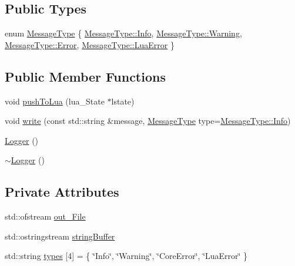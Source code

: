 \subsection*{Public Types}
\begin{DoxyCompactItemize}
\item 
enum \hyperlink{classZeta_1_1Logger_a8d3c7c723be28f87ac974c2dd07a1659}{Message\+Type} \{ \hyperlink{classZeta_1_1Logger_a8d3c7c723be28f87ac974c2dd07a1659a4059b0251f66a18cb56f544728796875}{Message\+Type\+::\+Info}, 
\hyperlink{classZeta_1_1Logger_a8d3c7c723be28f87ac974c2dd07a1659a0eaadb4fcb48a0a0ed7bc9868be9fbaa}{Message\+Type\+::\+Warning}, 
\hyperlink{classZeta_1_1Logger_a8d3c7c723be28f87ac974c2dd07a1659a902b0d55fddef6f8d651fe1035b7d4bd}{Message\+Type\+::\+Error}, 
\hyperlink{classZeta_1_1Logger_a8d3c7c723be28f87ac974c2dd07a1659a798ccc83d545e9494c77e9d6b3590267}{Message\+Type\+::\+Lua\+Error}
 \}
\end{DoxyCompactItemize}
\subsection*{Public Member Functions}
\begin{DoxyCompactItemize}
\item 
void \hyperlink{classZeta_1_1Logger_a4b6d5de6bcd9a2924fceea1f56266115}{push\+To\+Lua} (lua\+\_\+\+State $\ast$lstate)
\item 
void \hyperlink{classZeta_1_1Logger_af7a67ad7ba12c200679d8108339d4ed2}{write} (const std\+::string \&message, \hyperlink{classZeta_1_1Logger_a8d3c7c723be28f87ac974c2dd07a1659}{Message\+Type} type=\hyperlink{classZeta_1_1Logger_a8d3c7c723be28f87ac974c2dd07a1659a4059b0251f66a18cb56f544728796875}{Message\+Type\+::\+Info})
\item 
\hyperlink{classZeta_1_1Logger_ac780772489bea354784ebb686801bca9}{Logger} ()
\item 
\hyperlink{classZeta_1_1Logger_aae06a81dbb47d9b08484d7da844c37e3}{$\sim$\+Logger} ()
\end{DoxyCompactItemize}
\subsection*{Private Attributes}
\begin{DoxyCompactItemize}
\item 
std\+::ofstream \hyperlink{classZeta_1_1Logger_ac3dd593d966ebf8f8be09b8e0acb1665}{out\+\_\+\+File}
\item 
std\+::ostringstream \hyperlink{classZeta_1_1Logger_a23cc893d82b06f5e3196d34fe555ec46}{string\+Buffer}
\item 
std\+::string \hyperlink{classZeta_1_1Logger_ac458dd40dd985abdcdc0b23af80f3e6f}{types} \mbox{[}4\mbox{]} = \{ \char`\"{}Info\char`\"{}, \char`\"{}Warning\char`\"{}, \char`\"{}Core\+Error\char`\"{}, \char`\"{}Lua\+Error\char`\"{} \}
\end{DoxyCompactItemize}
